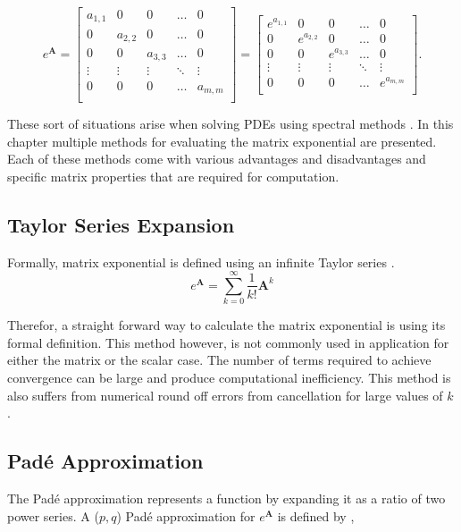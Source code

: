$$
e^{\boldsymbol{A}} = 
\begin{bmatrix}
a_{1,1} & 0 & 0 & \hdots & 0 \\
0 & a_{2,2} & 0 & \hdots & 0 \\
0 & 0 & a_{3,3} & \hdots & 0 \\
\vdots & \vdots & \vdots & \ddots & \vdots\\
0 & 0 & 0 & \hdots & a_{m,m} \\
\end{bmatrix}
=
\begin{bmatrix}
e^{a_{1,1}} & 0 & 0 & \hdots & 0 \\
0 & e^{a_{2,2}} & 0 & \hdots & 0 \\
0 & 0 & e^{a_{3,3}} & \hdots & 0 \\
\vdots & \vdots & \vdots & \ddots & \vdots\\
0 & 0 & 0 & \hdots & e^{a_{m,m}} \\
\end{bmatrix}
.
$$

\noindent
These sort of situations arise when solving PDEs using spectral methods \cite{ash2009} \cite{cox2002} \cite{kazimi1990}. In this chapter multiple methods for evaluating the matrix exponential are presented. Each of these methods come with various advantages and disadvantages and specific matrix properties that are required for computation. 


\subsection{Taylor Series Expansion}
Formally,  matrix exponential is defined using an infinite Taylor series \cite{exokit} \cite{moler2003} \cite{pusa2010}. 
\begin{equation}
    e^{\boldsymbol{A}} = \sum_{k = 0}^{\infty}\frac{1}{k!}\boldsymbol{A}^{k}
    \label{eq:power_series_exp}
\end{equation}

\noindent Therefor, a straight forward way to calculate the matrix exponential is using its formal definition. This method however, is not commonly used in application for either the matrix or the scalar case. The number of terms required to achieve convergence can be large and produce computational inefficiency. This method is also suffers from numerical round off errors from cancellation for large values of $k$ \cite{moler2003}. 


\subsection{Pad\'e Approximation}
The Pad\'e approximation represents a function by expanding it as a ratio of two power series. A ($p,q$) Pad\'e approximation for $e^{\boldsymbol{A}}$ is defined by \cite{moler2003}, 

